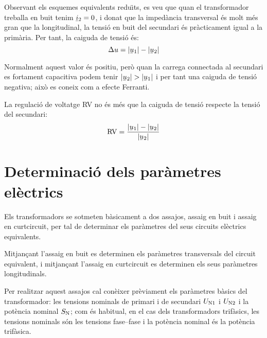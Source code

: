 Observant els esquemes equivalents redu\"{\i}ts, es veu que quan el transformador treballa en buit tenim $\cmplx{i}_2=0$, i donat que la imped\`{a}ncia transversal \'{e}s molt m\'{e}s gran que la longitudinal, la tensi\'{o} en buit del secundari \'{e}s pr\`{a}cticament igual a la prim\`{a}ria. Per tant, la caiguda de tensi\'{o} \'{e}s:
\begin{equation}
    \Delta u = |\cmplx{u}_1| - |\cmplx{u}_2|
\end{equation}

Normalment aquest valor \'{e}s positiu, per\`{o} quan la carrega connectada al secundari es fortament capacitiva podem tenir  $|\cmplx{u}_2| > |\cmplx{u}_1|$ i per tant una caiguda de tensi\'{o} negativa; aix\`{o} es coneix com a efecte Ferranti.

La regulaci\'{o} de voltatge RV no \'{e}s m\'{e}s que la caiguda de tensi\'{o} respecte la tensi\'{o} del secundari:
\begin{equation}
    \text{RV} = \frac{|\cmplx{u}_1| - |\cmplx{u}_2|}{|\cmplx{u}_2|}
\end{equation}

\section{Determinaci\'{o} dels par\`{a}metres el\`{e}ctrics}\label{sec:determ-param-trafo}

Els transformadors se sotmeten b\`{a}sicament a dos assajos, assaig en
buit i assaig en curtcircuit, per tal de determinar els par\`{a}metres
del seus circuits el\`{e}ctrics equivalents.

Mitjan\c{c}ant l'assaig en buit es determinen els par\`{a}metres
transversals del circuit equivalent, i mitjan\c{c}ant l'assaig en curtcircuit es determinen els seus par\`{a}metres longitudinals.

Per realitzar aquest assajos cal con\`{e}ixer pr\`{e}viament els par\`{a}metres
b\`{a}sics del transformador: les tensions nominals de primari i de
secundari $U_\mathrm{N1}$ i $U_\mathrm{N2}$ i la pot\`{e}ncia nominal
$S_\mathrm{N}$; com \'{e}s habitual, en el cas dels transformadors
trif\`{a}sics, les tensions nominals s\'{o}n les tensions fase--fase i la
pot\`{e}ncia nominal \'{e}s la pot\`{e}ncia trif\`{a}sica.

